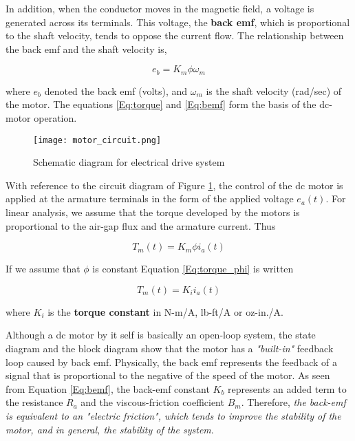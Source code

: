 In addition, when the conductor moves in the magnetic field, a voltage is generated across its terminals. This voltage, the \textbf{back emf}, which is proportional to the shaft velocity, tends to oppose the current flow. The relationship between the back emf and the shaft velocity is, 

\begin{equation}
	e_b = K_m \phi \omega_m
	\label{Eq:bemf}
\end{equation}

\noindent where $e_b$ denoted the back emf (volts), and $\omega_m$ is the shaft velocity (rad/sec) of the motor. The equations \ref{Eq:torque} and \ref{Eq:bemf} form the basis of the dc-motor operation.

\begin{figure}[h!]
\begin{center}
	\texttt{[image: motor\_circuit.png]}
	\caption{Schematic diagram for electrical drive system}	
	\label{Fig:motor_circuit}
\end{center}
\end{figure}

With reference to the circuit diagram of Figure \ref{Fig:motor_circuit}, the control of the dc motor is applied at the armature terminals in the form of the applied voltage $e_a(t)$. For linear analysis, we assume that the torque developed by the motors is proportional to the air-gap flux and the armature current. Thus

\begin{equation}
	T_m(t) = K_m \phi i_a(t)
	\label{Eq:torque_phi}
\end{equation}

\noindent If we assume that $\phi$ is constant Equation \ref{Eq:torque_phi} is written

\begin{equation}
	T_m(t) = K_i i_a(t)
\end{equation}

\noindent where $K_i$ is the \textbf{torque constant} in N-m/A, lb-ft/A or oz-in./A.

Although a dc motor by it self is basically an open-loop system, the state diagram and the block diagram show that the motor has a \textit{"built-in"} feedback loop caused by back emf. Physically, the back emf represents the feedback of a signal that is proportional to the negative of the speed of the motor. As seen from Equation \ref{Eq:bemf}, the back-emf constant $K_b$ represents an added term to the resistance $R_a$ and the viscous-friction coefficient $B_m$. Therefore, \textit{the back-emf is equivalent to an "electric friction", which tends to improve the stability of the motor, and in general, the stability of the system}.\newline


